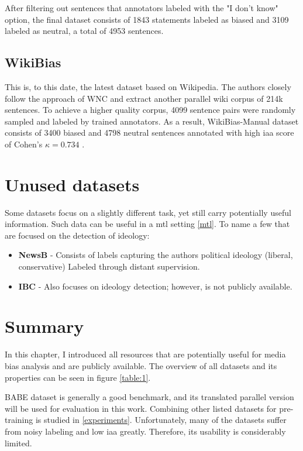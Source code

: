 After filtering out sentences that annotators labeled with the "I don't know" option, the final dataset consists of 1843 statements labeled as biased and 3109 labeled as neutral, a total of 4953 sentences.




\subsection{WikiBias}
This is, to this date, the latest dataset based on Wikipedia. The authors \cite{zhong-etal-2021-wikibias-detecting} closely follow the approach of WNC \cite{pryzant2020automatically} and extract another parallel wiki corpus of 214k sentences.
To achieve a higher quality corpus, 4099 sentence pairs were randomly sampled and labeled by trained annotators. As a result, WikiBias-Manual dataset consists of 3400 biased and 4798 neutral sentences annotated with high \gls{iaa} score of Cohen's $\kappa = 0.734$ \cite{cohen1960coefficient}.





\section{Unused datasets}
 Some datasets focus on a slightly different task, yet still carry potentially useful information. Such data can be useful in a \gls{mtl} setting \ref{mtl}. To name a few that are focused on the detection of ideology:
\begin{itemize}
\item \textbf{NewsB} - 
Consists of labels capturing the authors political ideology (liberal, conservative) Labeled through distant supervision.
\item \textbf{IBC} - Also focuses on ideology detection; however, is not publicly available.
\end{itemize}


\section{Summary}
In this chapter, I introduced all resources that are potentially useful for media bias analysis and are publicly available. The overview of all datasets and its properties can be seen in figure \ref{table:1}.

BABE dataset is generally a good benchmark, and its translated parallel version will be used for evaluation in this work. Combining other listed datasets for pre-training is studied in \ref{experiments}. Unfortunately, many of the datasets suffer from noisy labeling and low \gls{iaa} greatly. Therefore, its usability is considerably limited.
